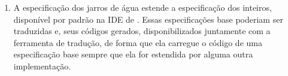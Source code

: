 \begin{enumerate}
  \item A especificação dos jarros de água estende a especificação dos inteiros,
    disponível por padrão na IDE de \TLAA. Essas especificações base poderiam
    ser traduzidas e, seus códigos gerados, disponibilizados juntamente com a
    ferramenta de tradução, de forma que ela carregue o código de uma
    especificação base sempre que ela for estendida por alguma outra
    implementação.
\end{enumerate}
